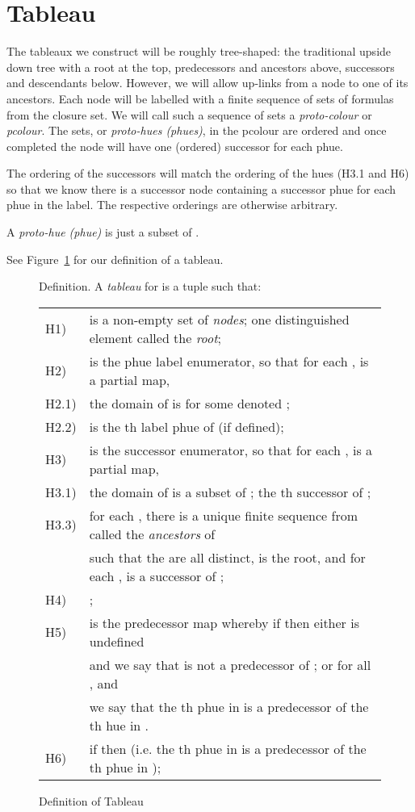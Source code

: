 \documentclass[submission,copyright,creativecommons]{eptcs}
\newenvironment{definition}{Definition. }{}
\begin{document}
\section{Tableau}
\label{sec:tableau}
\newcommand{\rot}{\mbox{\bf root}}

The tableaux we construct will be 
roughly tree-shaped:
the traditional upside down tree
with a root at the top,
predecessors and ancestors above,
successors and descendants below.
However, we will allow
up-links from a node
to one of its ancestors.
Each node will be labelled with a 
finite sequence of sets of formulas from the closure set.
We will call such a sequence of sets a
{\em proto-colour} or {\em pcolour}.
The sets, or {\em proto-hues (phues)}, in the pcolour
are ordered
and once completed
the node will have one (ordered) successor
for each phue.

The ordering of the successors
will match the ordering of the hues
(H3.1 and H6)
so that we know there
is a successor node
containing a successor phue
for each phue in the label.
The respective orderings
are otherwise arbitrary.

A {\em proto-hue (phue)} is just a subset of .

See Figure~\ref{fig:tab}
for our definition of a tableau.


\begin{figure}
\begin{definition}
A {\em tableau} for 
is a tuple
 such that:\\
\begin{tabular}{ll}
H1) &   is a non-empty set of {\em nodes}; one distinguished element called the {\em root};\\
H2) &  is the phue label enumerator, so that  for each ,  is a partial map, \\
H2.1) & the domain of  is  for some  denoted ;\\
 H2.2)  &  is the th label phue of  (if defined);\\
H3) &  is the successor enumerator, so that
      for each ,  is a partial map,\\
H3.1) &
the domain of  is a subset of ;
   the th successor of ;\\
 H3.3) & for each , there is a unique finite sequence  from  
 called the {\em ancestors} of \\&
            such that  the  are all distinct,
             is the root,  and for each ,  is a successor of ;\\
H4) & ;\\
H5) &  is the predecessor map whereby if  then either  is undefined\\&
and we say that  is not a predecessor of ; or for all ,  and\\
& we say that the th phue in  is a predecessor of the
 th hue in .\\
H6) & if  then 
 (i.e. the th phue in  is a predecessor of the th phue in );\\
\end{tabular}

\end{definition}
\caption{Definition of Tableau}
\label{fig:tab}

\end{figure}
\end{document}

